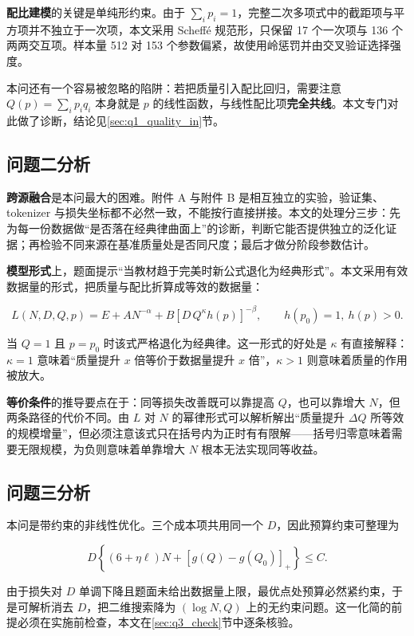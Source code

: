 \textbf{配比建模}的关键是单纯形约束。由于 $\sum_i p_i=1$，完整二次多项式中的截距项与平方项并不独立于一次项，本文采用 Scheffé 规范形，只保留 17 个一次项与 136 个两两交互项。样本量 512 对 153 个参数偏紧，故使用岭惩罚并由交叉验证选择强度。

本问还有一个容易被忽略的陷阱：若把质量引入配比回归，需要注意 $Q(p)=\sum_i p_iq_i$ 本身就是 $p$ 的线性函数，与线性配比项\textbf{完全共线}。本文专门对此做了诊断，结论见\ref{sec:q1_quality_in}节。

\subsection{问题二分析}

\textbf{跨源融合}是本问最大的困难。附件 A 与附件 B 是相互独立的实验，验证集、tokenizer 与损失坐标都不必然一致，不能按行直接拼接。本文的处理分三步：先为每一份数据做``是否落在经典律曲面上''的诊断，判断它能否提供独立的泛化证据；再检验不同来源在基准质量处是否同尺度；最后才做分阶段参数估计。

\textbf{模型形式}上，题面提示``当教材趋于完美时新公式退化为经典形式''。本文采用有效数据量的形式，把质量与配比折算成等效的数据量：

\begin{equation}
L(N,D,Q,p)=E+AN^{-\alpha}+B\left[D\,Q^{\kappa}h(p)\right]^{-\beta},\qquad h(p_0)=1,\ h(p)>0.
\end{equation}

当 $Q=1$ 且 $p=p_0$ 时该式严格退化为经典律。这一形式的好处是 $\kappa$ 有直接解释：$\kappa=1$ 意味着``质量提升 $x$ 倍等价于数据量提升 $x$ 倍''，$\kappa>1$ 则意味着质量的作用被放大。

\textbf{等价条件}的推导要点在于：同等损失改善既可以靠提高 $Q$，也可以靠增大 $N$，但两条路径的代价不同。由 $L$ 对 $N$ 的幂律形式可以解析解出``质量提升 $\Delta Q$ 所等效的规模增量''，但必须注意该式只在括号内为正时有有限解——括号归零意味着需要无限规模，为负则意味着单靠增大 $N$ 根本无法实现同等收益。

\subsection{问题三分析}

本问是带约束的非线性优化。三个成本项共用同一个 $D$，因此预算约束可整理为

\begin{equation}
D\left\{(6+\eta\ell)N+[g(Q)-g(Q_0)]_+\right\}\le C .
\end{equation}

由于损失对 $D$ 单调下降且题面未给出数据量上限，最优点处预算必然紧约束，于是可解析消去 $D$，把二维搜索降为 $(\log N,Q)$ 上的无约束问题。这一化简的前提必须在实施前检查，本文在\ref{sec:q3_check}节中逐条核验。

